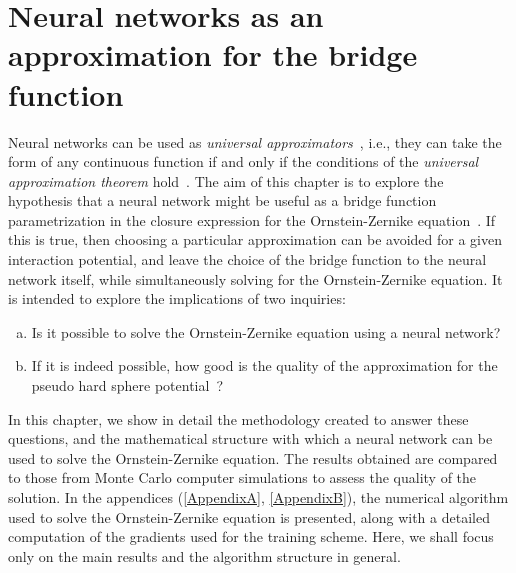 \newcommand{\vecr}{\mathbf{r}}
\newcommand{\veck}{\mathbf{k}}
\newcommand{\nnet}{N_{\theta}(\mathbf{r})}
\def\Itemautorefname{Figure}
\chapter{Neural networks as an approximation for the bridge function}
\label{Cap3}


Neural networks can be used as \emph{universal approximators}~\cite{hornikMultilayerFeedforwardNetworks1989, hornikApproximationCapabilitiesMultilayer1991, cybenkoApproximationSuperpositionsSigmoidal1989},
i.e., they can take the form of any continuous function if and only if the conditions of the
\emph{universal approximation theorem} hold~\cite{parkMinimumWidthUniversal2020,zhouUniversalityDeepConvolutional2020}.
The aim of this chapter is to explore the hypothesis that a neural network might be 
useful as a bridge function parametrization in the closure expression for the 
Ornstein-Zernike equation~\cite{hansenTheorySimpleLiquids2013}.
If this is true, then choosing a particular approximation can be avoided for a given 
interaction potential, and leave the choice of the bridge function to the neural network 
itself, while simultaneously solving for the Ornstein-Zernike equation. It is intended to
explore the implications of two inquiries:

\begin{enumerate}[(a)]
    \item Is it possible to solve the Ornstein-Zernike equation using a neural network?
    \item If it is indeed possible, how good is the quality of the approximation for the pseudo hard sphere potential~\cite{baezUsingSecondVirial2018}?
\end{enumerate}

In this chapter, we show in detail the methodology created to answer these questions, and
the mathematical structure with which a neural network can be used to solve the
Ornstein-Zernike equation.
The results obtained are compared to those from Monte Carlo computer simulations to assess 
the quality of the solution.
In the appendices (\autoref{AppendixA}, \autoref{AppendixB}), the numerical algorithm used 
to solve the Ornstein-Zernike equation
is presented, along with a detailed computation of the gradients used for the
training scheme. Here, we shall focus only on the main results and the algorithm structure
in general.


